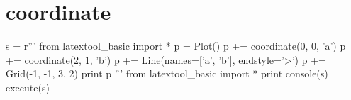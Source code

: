 \section{coordinate}

\begin{python}
s = r'''
from latextool_basic import *
p = Plot()
p += coordinate(0, 0, 'a')
p += coordinate(2, 1, 'b')
p += Line(names=['a', 'b'], endstyle='>')
p += Grid(-1, -1, 3, 2)
print p
'''
from latextool_basic import *
print console(s)
execute(s)
\end{python}
